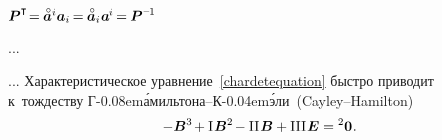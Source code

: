 \begin{otherlanguage}{russian}
$\bm{P}^{\T} \hspace{-0.4ex} = \hspace{-0.1ex} \mathcircabove{\bm{a}}^i \bm{a}_i \hspace{-0.2ex} = \hspace{-0.1ex} \mathcircabove{\bm{a}}_i \hspace{.1ex} \bm{a}^{\hspace{-0.16ex}i} \hspace{-0.2ex} = \hspace{-0.1ex} \bm{P}^{\expminusone}$

...



... Характеристическое уравнение~\eqref{chardetequation} быстро приводит к~тождеству Г\kern-0.08em\'{а}мильтона\hbox{--}К\kern-0.04em\'{э}ли~(Cayley\hbox{--}Hamilton)
\nopagebreak\vspace{.1em}\begin{equation}\label{cayley-hamilton:eq}
-\bm{B}^{3} \hspace{-0.25ex} + \mathrm{I}\hspace{0.16ex} \bm{B}^{2} \hspace{-0.25ex} - \mathrm{II}\hspace{0.16ex} \bm{B} + \mathrm{III}\hspace{0.16ex} \bm{E} = {^2\bm{0}} \hspace{0.1ex}.
\end{equation}

\end{otherlanguage}



\label{para:tensorfunctions}



